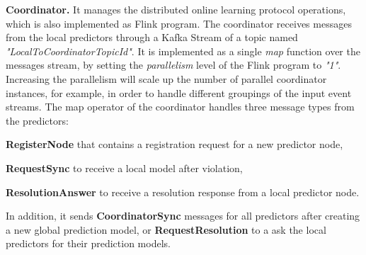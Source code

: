 \textbf{Coordinator.} It manages the distributed online learning protocol operations, which is also implemented as Flink program. The coordinator receives messages from the local predictors through a Kafka Stream of a topic named \textit{"LocalToCoordinatorTopicId"}. It is implemented as a single \textit{map} function over the messages stream, by setting the \textit{parallelism} level of the Flink program to \textit{"1"}. Increasing the parallelism will scale up the number of parallel coordinator instances, for example, in order to handle different groupings of the input event streams. The map operator of the coordinator  handles three message types from the predictors: \begin{enumerate*}[(i)]
	\item \textbf{RegisterNode} that contains  a registration request for a new predictor node,
	\item \textbf{RequestSync} to receive a local model after violation,
	\item \textbf{ResolutionAnswer} to receive a resolution response from a local predictor node.  
\end{enumerate*}  
 In addition, it sends \textbf{CoordinatorSync} messages for all predictors after creating a new global prediction model, or \textbf{RequestResolution} to a ask the local predictors for their prediction models.
 


                 